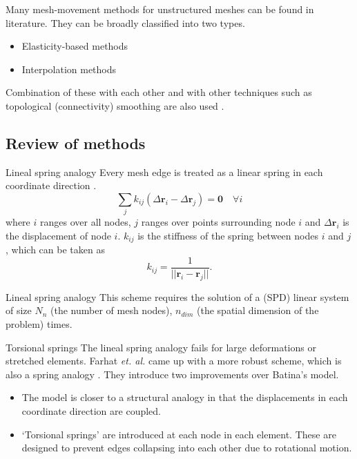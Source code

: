 \documentclass[t,12pt]{beamer}
\begin{document}
\begin{frame}
Many mesh-movement methods for unstructured meshes can be found in literature. They can be broadly classified into two types.
\vspace{0.2in}
\begin{itemize}
	\item Elasticity-based methods
	\item Interpolation methods
\end{itemize}
\vspace{0.2in}
Combination of these with each other and with other techniques such as topological (connectivity) smoothing are also used .
\end{frame}

\subsection{Review of methods}

\begin{frame}{Lineal spring analogy}
	Every mesh edge is treated as a linear spring in each coordinate direction .
	 \begin{equation}
	 \sum_j k_{ij}(\Delta \mathbf{r}_i - \Delta \mathbf{r}_j) = \mathbf{0} \quad \forall i
	 \label{spring}
	 \end{equation}
	 where $i$ ranges over all nodes, $j$ ranges over points surrounding node $i$ and $\Delta \mathbf{r}_i$ is the displacement of node $i$.
	 $k_{ij}$ is the stiffness of the spring between nodes $i$ and $j$, which can be taken as
	 \begin{equation}
	 k_{ij} = \frac{1}{||\mathbf{r}_i - \mathbf{r}_j||}.
	 \end{equation}
\end{frame}
\begin{frame}{Lineal spring analogy}
	This scheme requires the solution of a (SPD) linear system of size $N_n$ (the number of mesh nodes), $n_{dim}$ (the spatial dimension of the problem) times.
\end{frame}

\begin{frame}{Torsional springs}
The lineal spring analogy fails for large deformations or stretched elements. Farhat \emph{et. al.} came up with a more robust scheme, which is also a spring analogy .
\vspace{0.2in}
They introduce two improvements over Batina's model.
\begin{itemize}
	\item The model is closer to a structural analogy in that the displacements in each coordinate direction are coupled.
	\item `Torsional springs' are introduced at each node in each element. These are designed to prevent edges collapsing into each other due to rotational motion.
\end{itemize}
\end{frame}
\end{document}
